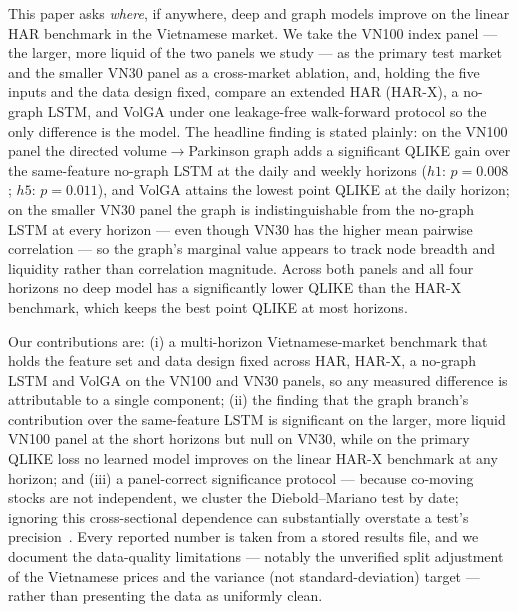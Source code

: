 \documentclass[runningheads]{llncs}
\begin{document}
This paper asks \emph{where}, if anywhere, deep and graph models improve on the linear HAR
benchmark in the Vietnamese market. We take the VN100 index panel --- the larger, more liquid of the
two panels we study --- as the primary test market and the smaller VN30 panel as a cross-market
ablation, and, holding the five inputs and the data design fixed, compare an extended HAR (HAR-X), a
no-graph LSTM, and VolGA under one leakage-free walk-forward protocol so the only difference is the
model. The headline finding is stated plainly: on the VN100 panel the directed
volume$\to$Parkinson graph adds a significant QLIKE gain over the same-feature no-graph LSTM at the
daily and weekly horizons ($h1$: $p=0.008$; $h5$: $p=0.011$), and VolGA attains the lowest point
QLIKE at the daily horizon; on the smaller VN30 panel the graph is indistinguishable from the
no-graph LSTM at every horizon --- even though VN30 has the higher mean pairwise correlation --- so
the graph's marginal value appears to track node breadth and liquidity rather than correlation
magnitude. Across both panels and all four horizons no deep model has a significantly lower QLIKE
than the HAR-X benchmark, which keeps the best point QLIKE at most horizons.

Our contributions are: (i) a multi-horizon Vietnamese-market benchmark that holds the feature set
and data design fixed across HAR, HAR-X, a no-graph LSTM and VolGA on the VN100 and VN30 panels, so
any measured difference is attributable to a single component; (ii) the finding that the graph
branch's contribution over the same-feature LSTM is significant on the larger, more liquid VN100
panel at the short horizons but null on VN30, while on the primary QLIKE loss no learned model
improves on the linear HAR-X benchmark at any horizon; and (iii) a panel-correct significance
protocol --- because co-moving stocks are not independent, we cluster the Diebold--Mariano test by
date; ignoring this cross-sectional dependence can substantially overstate a test's
precision~\cite{petersen2009}. Every reported number is taken from a stored results file, and we document
the data-quality limitations --- notably the unverified split adjustment of the Vietnamese prices and
the variance (not standard-deviation) target --- rather than presenting the data as uniformly clean.
\end{document}
